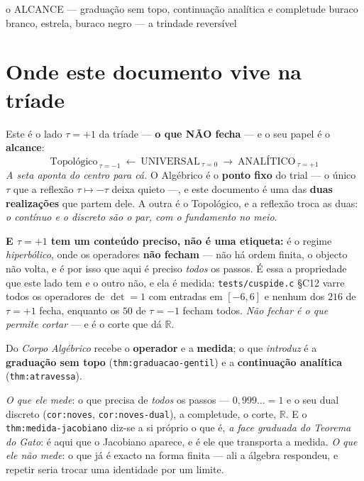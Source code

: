\documentclass[11pt,a4paper]{article}
\newcommand{\code}[1]{\texttt{\small #1}}
\begin{document}
       {o ALCANCE --- graduação sem topo, continuação analítica e completude}
       {buraco branco, estrela, buraco negro --- a trindade reversível}
\maketitle

\section*{Onde este documento vive na tríade}

Este é o lado $\tau=+1$ da tríade --- \textbf{o que NÃO fecha} --- e o seu papel é o
\textbf{alcance}:
\[
\text{Topológico}_{\ \tau=-1}\ \longleftarrow\ \text{UNIVERSAL}_{\ \tau=0}\
\longrightarrow\ \boxed{\text{ANALÍTICO}}_{\ \tau=+1}
\]
\emph{A seta aponta do centro para cá.} O Algébrico é o \textbf{ponto fixo} do trial --- o
único $\tau$ que a reflexão $\tau\mapsto-\tau$ deixa quieto ---, e este documento é uma das
\textbf{duas realizações} que partem dele. A outra é o Topológico, e a reflexão troca as
duas: \emph{o contínuo e o discreto são o par, com o fundamento no meio}.

\textbf{E $\tau=+1$ tem um conteúdo preciso, não é uma etiqueta:} é o regime
\emph{hiperbólico}, onde os operadores \textbf{não fecham} --- não há ordem finita, o
objecto não volta, e é por isso que aqui é preciso \emph{todos} os passos. É essa a
propriedade que este lado tem e o outro não, e ela é medida: \code{tests/cuspide.c} \S C12
varre todos os operadores de $\det=1$ com entradas em $[-6,6]$ e nenhum dos $216$ de
$\tau=+1$ fecha, enquanto os $50$ de $\tau=-1$ fecham todos. \emph{Não fechar é o que
permite cortar} --- e é o corte que dá $\mathbb{R}$.

\smallskip
Do \emph{Corpo Algébrico} recebe o \textbf{operador} e a \textbf{medida}; o que
\emph{introduz} é a \textbf{graduação sem topo} (\code{thm:graduacao-gentil}) e a
\textbf{continuação analítica} (\code{thm:atravessa}).

\emph{O que ele mede}: o que precisa de \emph{todos} os passos --- $0{,}999\ldots=1$ e o
seu dual discreto (\code{cor:noves}, \code{cor:noves-dual}), a completude, o corte,
$\mathbb{R}$. E o \code{thm:medida-jacobiano} diz-se a si próprio o que é, \emph{a face
graduada do Teorema do Gato}: é aqui que o Jacobiano aparece, e é ele que transporta a
medida. \emph{O que ele não mede}: o que já é exacto na forma finita --- ali a álgebra
respondeu, e repetir seria trocar uma identidade por um limite.
\end{document}
